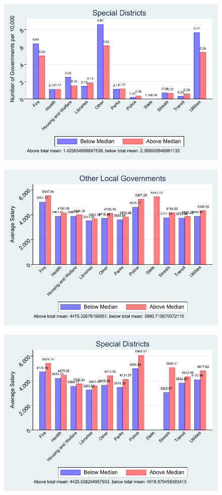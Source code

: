 \documentclass{article}
\begin{document}
\begin{figure}
	\includegraphics{figures/implications/spdist_emp_pc_1.pdf}
\end{figure}
\clearpage
\begin{figure}
	\includegraphics{figures/implications/spdist_emp_salary__0.pdf}
\end{figure}
\begin{figure}
	\includegraphics{figures/implications/spdist_emp_salary__1.pdf}
\end{figure}
\clearpage
\end{document}
